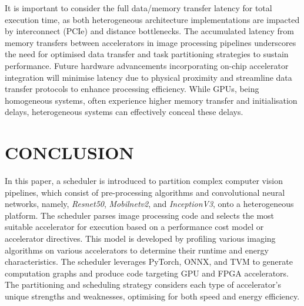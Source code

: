 \documentclass[]{spie}  %
\begin{document}
It is important to consider the full data/memory transfer latency for total execution time, as both heterogeneous architecture implementations are impacted by interconnect (PCIe) and distance bottlenecks. The accumulated latency from memory transfers between accelerators in image processing pipelines underscores the need for optimised data transfer and task partitioning strategies to sustain performance. Future hardware advancements incorporating on-chip accelerator integration will minimise latency due to physical proximity and streamline data transfer protocols to enhance processing efficiency. While GPUs, being homogeneous systems, often experience higher memory transfer and initialisation delays, heterogeneous systems can effectively conceal these delays. 

\label{sec:results}




\section{CONCLUSION}
\label{sec:conclusion}

In this paper, a scheduler is introduced to partition complex computer vision pipelines, which consist of pre-processing algorithms and convolutional neural networks, namely, \textit{Resnet50}, \textit{Mobilnetv2}, and \textit{InceptionV3}, onto a heterogeneous platform. The scheduler parses image processing code and selects the most suitable accelerator for execution based on a performance cost model or accelerator directives. This model is developed by profiling various imaging algorithms on various accelerators to determine their runtime and energy characteristics. The scheduler leverages PyTorch, ONNX, and TVM to generate computation graphs and produce code targeting GPU and FPGA accelerators. The partitioning and scheduling strategy considers each type of accelerator's unique strengths and weaknesses, optimising for both speed and energy efficiency. 
\end{document}
